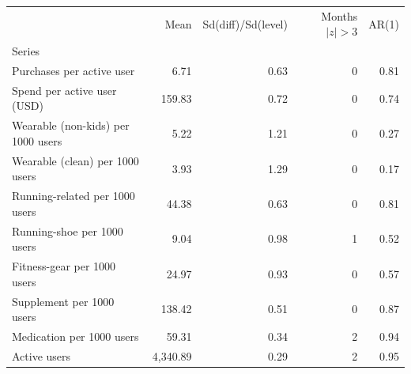 \begin{tabular}{lrrrr}
\toprule
 & Mean & Sd(diff)/Sd(level) & Months $|z|>3$ & AR(1) \\
Series &  &  &  &  \\
\midrule
Purchases per active user & 6.71 & 0.63 & 0 & 0.81 \\
Spend per active user (USD) & 159.83 & 0.72 & 0 & 0.74 \\
Wearable (non-kids) per 1000 users & 5.22 & 1.21 & 0 & 0.27 \\
Wearable (clean) per 1000 users & 3.93 & 1.29 & 0 & 0.17 \\
Running-related per 1000 users & 44.38 & 0.63 & 0 & 0.81 \\
Running-shoe per 1000 users & 9.04 & 0.98 & 1 & 0.52 \\
Fitness-gear per 1000 users & 24.97 & 0.93 & 0 & 0.57 \\
Supplement per 1000 users & 138.42 & 0.51 & 0 & 0.87 \\
Medication per 1000 users & 59.31 & 0.34 & 2 & 0.94 \\
Active users & 4,340.89 & 0.29 & 2 & 0.95 \\
\bottomrule
\end{tabular}
